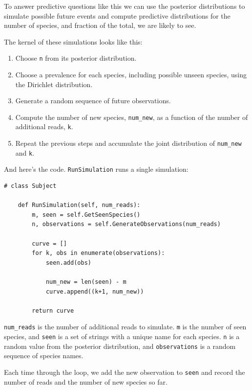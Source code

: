 \documentclass[12pt]{book}
\begin{document}
To answer predictive questions like this we can use the posterior
distributions to simulate possible future events and compute
predictive distributions for the number of species, and fraction of
the total, we are likely to see.

The kernel of these simulations looks like this:

\begin{enumerate}

\item Choose {\tt n} from its posterior distribution.

\item Choose a prevalence for each species, including possible unseen
  species, using the Dirichlet distribution.

\item Generate a random sequence of future observations.

\item Compute the number of new species, \verb"num_new", as a function
  of the number of additional reads, {\tt k}.

\item Repeat the previous steps and accumulate the joint distribution
  of \verb"num_new" and {\tt k}.

\end{enumerate}

And here's the code.  {\tt RunSimulation} runs a single simulation:

\begin{verbatim}
# class Subject

    def RunSimulation(self, num_reads):
        m, seen = self.GetSeenSpecies()
        n, observations = self.GenerateObservations(num_reads)

        curve = []
        for k, obs in enumerate(observations):
            seen.add(obs)

            num_new = len(seen) - m
            curve.append((k+1, num_new))

        return curve
\end{verbatim}

\verb"num_reads" is the number of additional reads to simulate.
{\tt m} is the number of seen species, and {\tt seen} is a set of
strings with a unique name for each species.
{\tt n} is a random value from the posterior distribution, and
{\tt observations} is a random sequence of species names.

Each time through the loop, we add the new observation to
{\tt seen} and record the number of reads and the number of
new species so far.
\end{document}

